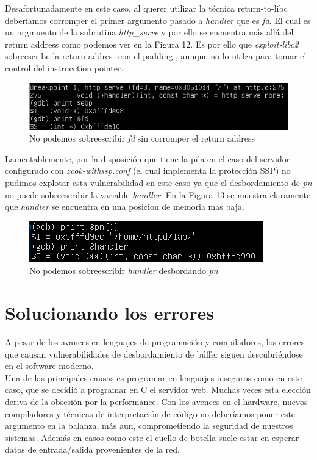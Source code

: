 \documentclass[12pt]{article}
\begin{document}
Desafortunadamente en este caso, al querer utilizar la técnica return-to-libc deberíamos corromper el primer argumento pasado a \textit{handler} que es \textit{fd}. El cual es un argmuento de la subrutina \textit{http\_serve} y por ello se encuentra más allá del return address como podemos ver en la Figura 12. Es por ello que \textit{exploit-libc2} sobreescribe la return addres -con el padding-, aunque no lo utilza para tomar el control del instrucction pointer. \\

\begin{figure}[htp]
\centering
\includegraphics[scale=0.75]{./imagenes/fd.png}
\caption{No podemos sobreescribir \textit{fd} sin corromper el return address}
\end{figure} 

Lamentablemente, por la disposición que tiene la pila en el caso del servidor configurado con \textit{zook-withssp.conf} (el cual implementa la protección SSP) no pudimos explotar esta vulnerabilidad en este caso ya que el desbordamiento de \textit{pn} no puede sobreescribir la variable \textit{handler}. En la Figura 13 se muestra claramente que \textit{handler} se encuentra en una posicion de memoria mas baja.

\begin{figure}[htp]
\centering
\includegraphics[scale=1]{./imagenes/withsspinfo.png}
\caption{No podemos sobreescribir \textit{handler} desbordando \textit{pn}}
\end{figure} 

\section{ Solucionando los errores }
A pesar de los avances en lenguajes de programación y compiladores, los errores que causan vulnerabilidades de desbordamiento de búffer siguen descubriéndose en el software moderno. \\

Una de las principales causas es programar en lenguajes inseguros como en este caso, que se decidió a programar en C el servidor web. Muchas veces esta elección deriva de la obsesión por la performance. Con los avences en el hardware, nuevos compiladores y técnicas de interpretación de código no deberíamos poner este argumento en la balanza, más aun, comprometiendo la seguridad de nuestros sistemas. Además en casos como este el cuello de botella suele estar en esperar datos de entrada/salida provenientes de la red. \\
\end{document}
